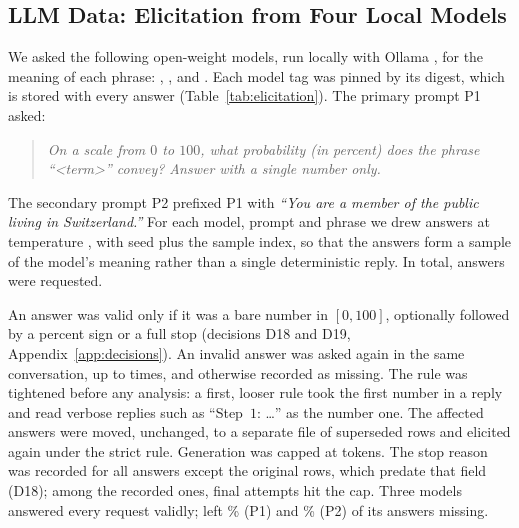 \begin{table}[t]
\caption{Profile of the CAPphrase respondents (share of all respondents; ``missing'' = not reported).}
\label{tab:profile}

\end{table}

\subsection{LLM Data: Elicitation from Four Local Models}
\label{sec:design-llm}

We asked the following \WtwoNModels{} open-weight models, run locally with Ollama \citep{ollama2026}, for the meaning of each phrase:
\WModelLlamaThreeOneEightB{} \citep{grattafiori2024llama3}, \WModelQwenTwoFiveSevenB{} \citep{qwen2024qwen25},
\WModelGemmaTwoNineB{} \citep{gemma2024gemma2} and \WModelMistralSevenB{} \citep{jiang2023mistral}.
Each model tag was pinned by its digest, which is stored with every answer (Table~\ref{tab:elicitation}).
The primary prompt P1 asked:
\begin{quote}
\textit{On a scale from $0$ to $100$, what probability (in percent) does the phrase ``\textless term\textgreater{}''
convey? Answer with a single number only.}
\end{quote}
The secondary prompt P2 prefixed P1 with \textit{``You are a member of the public living in Switzerland.''}
For each model, prompt and phrase we drew \WSamples{} answers at temperature \WTemperature{}, with seed
\WSeedBase{} plus the sample index, so that the answers form a sample of the model's meaning rather than a single
deterministic reply.
In total, \WtwoAnswersTotalNRows{} answers were requested.

An answer was valid only if it was a bare number in $[0, 100]$, optionally followed by a percent sign or a full stop
(decisions D18 and D19, Appendix~\ref{app:decisions}).
An invalid answer was asked again in the same conversation, up to \WMaxReasks{} times, and otherwise recorded as missing.
The rule was tightened before any analysis: a first, looser rule took the first number in a reply and read verbose
replies such as ``Step~$1$: \dots'' as the number one.
The \WtwoAnswersTotalNSuperseded{} affected \WModelLlamaThreeOneEightB{} answers were moved, unchanged, to a separate
file of superseded rows and elicited again under the strict rule.
Generation was capped at \WNumPredict{} tokens.
The stop reason was recorded for all answers except the original \WModelLlamaThreeOneEightB{} rows, which predate that
field (D18); among the recorded ones, \WtwoAnswersTotalNLength{} final attempts hit the cap.
Three models answered every request validly; \WModelMistralSevenB{} left
\WtwoAnswersMistralSevenBPOneInvalidRatePct{}\% (P1) and \WtwoAnswersMistralSevenBPTwoInvalidRatePct{}\% (P2) of its
answers missing.

